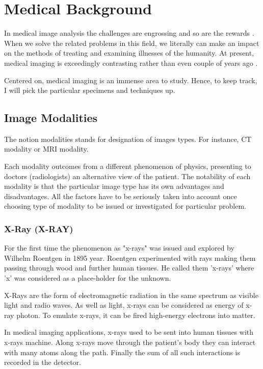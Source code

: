 \chapter{Medical Background}
\label{ch:rworks}

In medical image analysis the challenges are engrossing and so are the rewards \cite{Duncan2000}. When we solve the related problems in this field, we literally can make an impact on the methods of treating and examining illnesses of the humanity. At present, medical imaging is exceedingly contrasting rather than even couple of years ago \cite{Wang2020}. 

Centered on, medical imaging is an immense area to study. Hence, to keep track, I will pick the particular specimens and techniques up.

\section{Image Modalities}
The notion modalities \cite{Seeram2004} stands for designation of images types. For instance, CT modality or MRI modality. 

Each modality outcomes from a different phenomenon of physics, presenting to doctors (radiologists) an alternative view of the patient. The notability of each modality is that the particular image type has its own advantages and disadvantages. All the factors have to be seriously taken into account once choosing type of modality to be issued or investigated for particular problem.

\subsection{X-Ray (X-RAY)}
For the first time the phenomenon as "x-rays" was issued and explored by Wilhelm Roentgen in 1895 year. Roentgen experimented with rays making them passing through wood and further human tissues. He called them \cite{Barker1996} 'x-rays' where 'x' was considered as a place-holder for the unknown.

X-Rays are the form of electromagnetic radiation in the same spectrum as visible light and radio waves. As well as light, x-rays can be considered as energy of x-ray photon. To emulate x-rays, it can be fired high-energy electrons into matter. 

In medical imaging applications, x-rays used to be sent into human tissues with x-rays machine. Along x-rays move through the patient's body they can interact with many atoms along the path. Finally the sum of all such interactions is recorded in the detector. 

